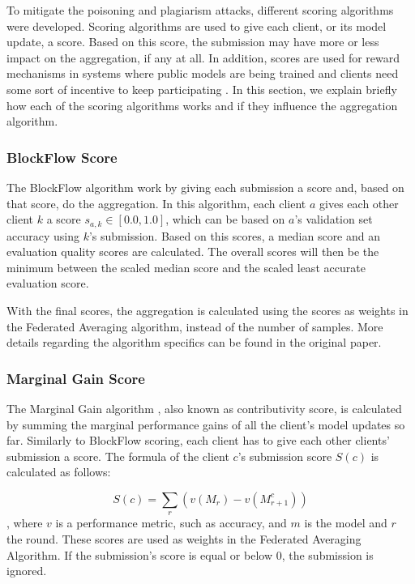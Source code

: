 To mitigate the poisoning and plagiarism attacks, different scoring algorithms were developed. Scoring algorithms are used to give each client, or its model update, a score. Based on this score, the submission may have more or less impact on the aggregation, if any at all. In addition, scores are used for reward mechanisms in systems where public models are being trained and clients need some sort of incentive to keep participating \cite{8945913, 8832210, 8905038, 9006344}. In this section, we explain briefly how each of the scoring algorithms works and if they influence the aggregation algorithm.

\subsubsection{BlockFlow Score}

The BlockFlow algorithm \cite{10.48550/arxiv.2007.03856} work by giving each submission a score and, based on that score, do the aggregation. In this algorithm, each client $a$ gives each other client $k$ a score $s_{a,k} \in [0.0, 1.0]$, which can be based on $a$'s validation set accuracy using $k$'s submission. Based on this scores, a median score and an evaluation quality scores are calculated. The overall scores will then be the minimum between the scaled median score and the scaled least accurate evaluation score.

With the final scores, the aggregation is calculated using the scores as weights in the Federated Averaging algorithm, instead of the number of samples. More details regarding the algorithm specifics can be found in the original paper.

\subsubsection{Marginal Gain Score}

The Marginal Gain algorithm \cite{10.48550/arxiv.2011.07516}, also known as contributivity score, is calculated by summing the marginal performance gains of all the client's model updates so far. Similarly to BlockFlow scoring, each client has to give each other clients' submission a score. The formula of the client $c$'s submission score $S(c)$ is calculated as follows:

\begin{equation}
    \label{eq:marginal-gain}
    S(c)= \sum_r(v(M_r)-v(M^c_{r+1}))
\end{equation}
, where $v$ is a performance metric, such as accuracy, and $m$ is the model and $r$ the round. These scores are used as weights in the Federated Averaging Algorithm. If the submission's score is equal or below $0$, the submission is ignored.


